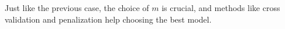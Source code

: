 \documentclass{article}
\begin{document}
\begin{comment}
\begin{align}
    \hat{f}_\mathrm{K}=\sum_{k_1=1}^{K_1}\ldots\sum_{k_d=1}^{K_d}\hat{a}_{k_1,\ldots,k_d}\varphi_{k_1,\ldots,k_d}, \quad \hat{a}_{k_1,\ldots,k_d}=\frac{1}{n}\sum_{i=1}^n \varphi_{k_1,\ldots,k_d}(X_i) = \frac{1}{n}\sum_{i=1}^n \prod_{j=1}^d \varphi_{k_j}(X_i)
\end{align}
\end{comment}
Just like the previous case, the choice of \(m\) is crucial, and methods like cross validation and penalization help choosing the best model.

\bigskip

\newpage
\nocite{Coste_2025}
\nocite{lipman2024flowmatchingguidecode}
\nocite{strasman2025analysisnoiseschedulescorebased}
\nocite{battey2014smoothprojecteddensityestimation}
\nocite{dionblanc2025nonparametricdensityestimation}
\nocite{mathieu2024flow}


\end{document}
